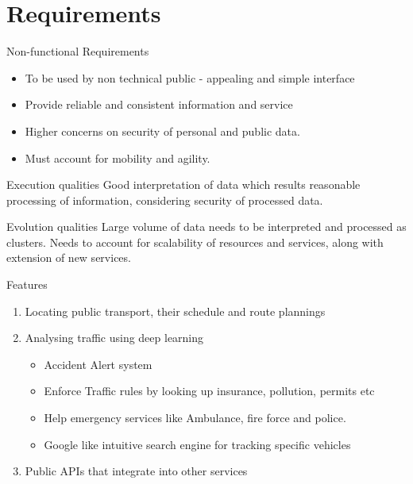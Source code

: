 \documentclass{beamer}
\begin{document}
\section{Requirements}
\begin{frame}{Non-functional Requirements}
    \begin{itemize}
        \item To be used by non technical public - appealing and simple interface
        \item Provide reliable and consistent information and service
        \item Higher concerns on security of personal and public data.
        \item Must account for mobility and agility.
    \end{itemize}
    
    \begin{block}{Execution qualities}
        Good interpretation of data which results reasonable processing of information, considering security of processed data.
    \end{block}

    \begin{block}{Evolution qualities}
        Large volume of data needs to be interpreted and processed as clusters. Needs to account for scalability of resources and services, along with extension of new services.
    \end{block}
\end{frame}

\begin{frame}{Features}
	\begin{enumerate}
		\item Locating public transport, their schedule and route plannings
		\item Analysing traffic using deep learning
		\begin{itemize}
		    \item Accident Alert system
		    \item Enforce Traffic rules by looking up insurance, pollution, permits etc
		    \item Help emergency services like Ambulance, fire force and police.
		    \item Google like intuitive search engine for tracking specific vehicles
		\end{itemize}
		\item Public APIs that integrate into other services
	\end{enumerate}
\end{frame}
\end{document}
